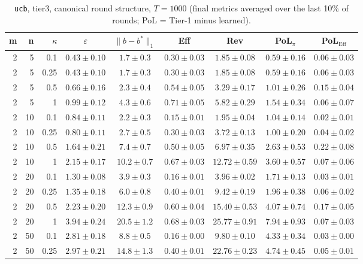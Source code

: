 \begin{table}[htbp]
\centering
\scriptsize
\caption{\texttt{ucb}, tier3, canonical round structure, $T=1000$ (final metrics averaged over the last 10\% of rounds; PoL = Tier-1 minus learned).}
\label{tab:tier3_ucb_canonical}
\begin{tabular}{@{}rrrcccccc@{}}
\toprule
m & n & $\kappa$ & $\varepsilon$ & $\|b-b^*\|_1$ & Eff & Rev & PoL$_\pi$ & PoL$_\mathrm{Eff}$ \\
\midrule
2 & 5 & 0.1 & $0.43 \pm 0.10$ & $1.7 \pm 0.3$ & $0.30 \pm 0.03$ & $1.85 \pm 0.08$ & $0.59 \pm 0.16$ & $0.06 \pm 0.03$ \\
2 & 5 & 0.25 & $0.43 \pm 0.10$ & $1.7 \pm 0.3$ & $0.30 \pm 0.03$ & $1.85 \pm 0.08$ & $0.59 \pm 0.16$ & $0.06 \pm 0.03$ \\
2 & 5 & 0.5 & $0.66 \pm 0.16$ & $2.3 \pm 0.4$ & $0.54 \pm 0.05$ & $3.29 \pm 0.17$ & $1.01 \pm 0.26$ & $0.15 \pm 0.04$ \\
2 & 5 & 1 & $0.99 \pm 0.12$ & $4.3 \pm 0.6$ & $0.71 \pm 0.05$ & $5.82 \pm 0.29$ & $1.54 \pm 0.34$ & $0.06 \pm 0.07$ \\
2 & 10 & 0.1 & $0.84 \pm 0.11$ & $2.2 \pm 0.3$ & $0.15 \pm 0.01$ & $1.95 \pm 0.04$ & $1.04 \pm 0.14$ & $0.02 \pm 0.01$ \\
2 & 10 & 0.25 & $0.80 \pm 0.11$ & $2.7 \pm 0.5$ & $0.30 \pm 0.03$ & $3.72 \pm 0.13$ & $1.00 \pm 0.20$ & $0.04 \pm 0.02$ \\
2 & 10 & 0.5 & $1.64 \pm 0.21$ & $7.4 \pm 0.7$ & $0.50 \pm 0.05$ & $6.97 \pm 0.35$ & $2.63 \pm 0.53$ & $0.22 \pm 0.08$ \\
2 & 10 & 1 & $2.15 \pm 0.17$ & $10.2 \pm 0.7$ & $0.67 \pm 0.03$ & $12.72 \pm 0.59$ & $3.60 \pm 0.57$ & $0.07 \pm 0.06$ \\
2 & 20 & 0.1 & $1.30 \pm 0.08$ & $3.9 \pm 0.3$ & $0.16 \pm 0.01$ & $3.96 \pm 0.02$ & $1.71 \pm 0.13$ & $0.03 \pm 0.01$ \\
2 & 20 & 0.25 & $1.35 \pm 0.18$ & $6.0 \pm 0.8$ & $0.40 \pm 0.01$ & $9.42 \pm 0.19$ & $1.96 \pm 0.38$ & $0.06 \pm 0.02$ \\
2 & 20 & 0.5 & $2.23 \pm 0.20$ & $12.3 \pm 0.9$ & $0.60 \pm 0.04$ & $15.40 \pm 0.53$ & $4.07 \pm 0.74$ & $0.17 \pm 0.05$ \\
2 & 20 & 1 & $3.94 \pm 0.24$ & $20.5 \pm 1.2$ & $0.68 \pm 0.03$ & $25.77 \pm 0.91$ & $7.94 \pm 0.93$ & $0.07 \pm 0.03$ \\
2 & 50 & 0.1 & $2.81 \pm 0.18$ & $8.8 \pm 0.5$ & $0.16 \pm 0.00$ & $9.80 \pm 0.10$ & $4.33 \pm 0.34$ & $0.03 \pm 0.00$ \\
2 & 50 & 0.25 & $2.97 \pm 0.21$ & $14.8 \pm 1.3$ & $0.40 \pm 0.01$ & $22.76 \pm 0.23$ & $4.74 \pm 0.45$ & $0.05 \pm 0.01$ \\

\end{tabular}
\end{table}

